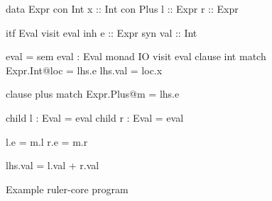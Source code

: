 \begin{figure}[h!]
\begin{minipage}[t]{0.3\linewidth}
\begin{code}
data Expr
  con Int
    x :: Int
  con Plus
    l :: Expr
    r :: Expr
    
itf Eval
  visit eval
    inh e :: Expr
    syn val :: Int
\end{code} 
\end{minipage}
\begin{minipage}[t]{0.7\linewidth}
\begin{code}
{
eval = sem eval : Eval monad IO
         visit eval
           clause int
             match Expr.Int@loc = lhs.e
             lhs.val = loc.x

           clause plus
             match Expr.Plus@m = lhs.e

             child l : Eval = eval
             child r : Eval = eval

             l.e = m.l
             r.e = m.r

             lhs.val = l.val + r.val
}
\end{code}
\end{minipage}
\caption{Example ruler-core program}
\label{example:expr}
\end{figure}
